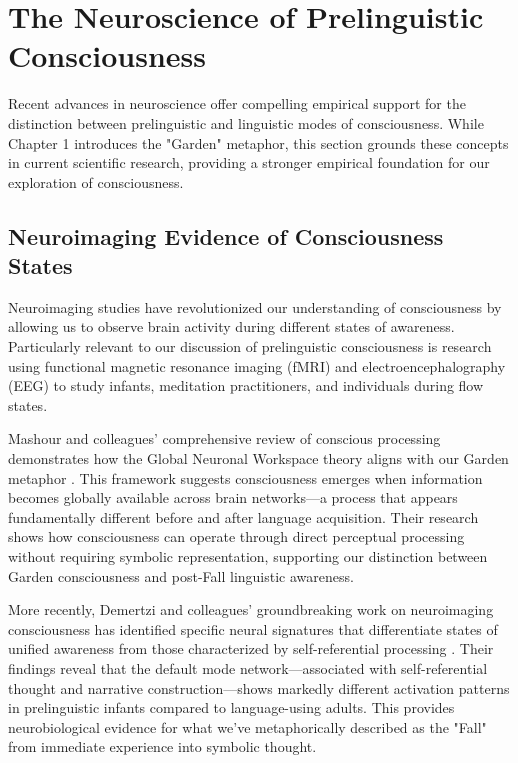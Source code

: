 \section{The Neuroscience of Prelinguistic Consciousness}

Recent advances in neuroscience offer compelling empirical support for the distinction between prelinguistic and linguistic modes of consciousness. While Chapter 1 introduces the "Garden" metaphor, this section grounds these concepts in current scientific research, providing a stronger empirical foundation for our exploration of consciousness.

\subsection{Neuroimaging Evidence of Consciousness States}

Neuroimaging studies have revolutionized our understanding of consciousness by allowing us to observe brain activity during different states of awareness. Particularly relevant to our discussion of prelinguistic consciousness is research using functional magnetic resonance imaging (fMRI) and electroencephalography (EEG) to study infants, meditation practitioners, and individuals during flow states.

Mashour and colleagues' comprehensive review of conscious processing demonstrates how the Global Neuronal Workspace theory aligns with our Garden metaphor \parencite{mashour2020noninvasive}. This framework suggests consciousness emerges when information becomes globally available across brain networks—a process that appears fundamentally different before and after language acquisition. Their research shows how consciousness can operate through direct perceptual processing without requiring symbolic representation, supporting our distinction between Garden consciousness and post-Fall linguistic awareness.

More recently, Demertzi and colleagues' groundbreaking work on neuroimaging consciousness has identified specific neural signatures that differentiate states of unified awareness from those characterized by self-referential processing \parencite{demertzi2024neuroimaging}. Their findings reveal that the default mode network—associated with self-referential thought and narrative construction—shows markedly different activation patterns in prelinguistic infants compared to language-using adults. This provides neurobiological evidence for what we've metaphorically described as the "Fall" from immediate experience into symbolic thought.

